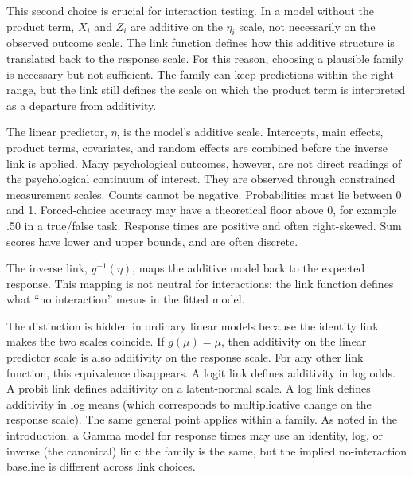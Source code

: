 \documentclass[
  man,
  longtable,
  nolmodern,
  notxfonts,
  notimes,
  colorlinks=true,linkcolor=blue,citecolor=blue,urlcolor=blue]{apa7}
\begin{document}
This second choice is crucial for interaction testing. In a model
without the product term, \(X_i\) and \(Z_i\) are additive on the
\(\eta_i\) scale, not necessarily on the observed outcome scale. The
link function defines how this additive structure is translated back to
the response scale. For this reason, choosing a plausible family is
necessary but not sufficient. The family can keep predictions within the
right range, but the link still defines the scale on which the product
term is interpreted as a departure from additivity.

\begin{tcolorbox}[enhanced jigsaw, toprule=.15mm, colbacktitle=quarto-callout-note-color!10!white, title={What the link function does}, bottomtitle=1mm, rightrule=.15mm, colback=white, toptitle=1mm, breakable, opacitybacktitle=0.6, bottomrule=.15mm, coltitle=black, titlerule=0mm, arc=.35mm, opacityback=0, colframe=quarto-callout-note-color-frame, leftrule=.75mm, left=2mm]

The linear predictor, \(\eta\), is the model's additive scale.
Intercepts, main effects, product terms, covariates, and random effects
are combined before the inverse link is applied. Many psychological
outcomes, however, are not direct readings of the psychological
continuum of interest. They are observed through constrained measurement
scales. Counts cannot be negative. Probabilities must lie between 0 and
1. Forced-choice accuracy may have a theoretical floor above 0, for
example .50 in a true/false task. Response times are positive and often
right-skewed. Sum scores have lower and upper bounds, and are often
discrete.

The inverse link, \(g^{-1}(\eta)\), maps the additive model back to the
expected response. This mapping is not neutral for interactions: the
link function defines what ``no interaction'' means in the fitted model.

\end{tcolorbox}

The distinction is hidden in ordinary linear models because the identity
link makes the two scales coincide. If \(g(\mu) = \mu\), then additivity
on the linear predictor scale is also additivity on the response scale.
For any other link function, this equivalence disappears. A logit link
defines additivity in log odds. A probit link defines additivity on a
latent-normal scale. A log link defines additivity in log means (which
corresponds to multiplicative change on the response scale). The same
general point applies within a family. As noted in the introduction, a
Gamma model for response times may use an identity, log, or inverse (the
canonical) link: the family is the same, but the implied no-interaction
baseline is different across link choices.
\end{document}
